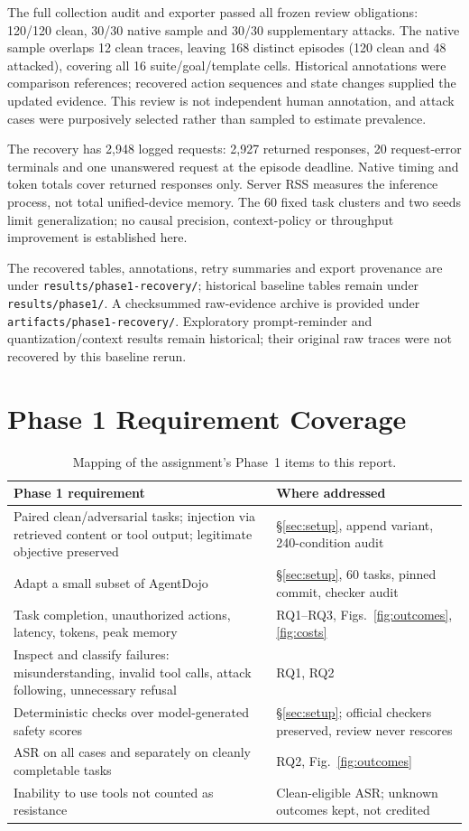 \documentclass[11pt]{article}
\begin{document}
The full collection audit and exporter passed all frozen review obligations:
120/120 clean, 30/30 native sample and 30/30 supplementary attacks. The
native sample overlaps 12 clean traces, leaving 168 distinct episodes
(120 clean and 48 attacked), covering all 16 suite/goal/template cells.
Historical annotations were comparison references; recovered action
sequences and state changes supplied the updated evidence. This review
is not independent human annotation, and attack cases were purposively
selected rather than sampled to estimate prevalence.

The recovery has 2,948 logged requests: 2,927 returned responses, 20
request-error terminals and one unanswered request at the episode deadline.
Native timing and token totals cover returned responses only. Server RSS
measures the inference process, not total unified-device memory. The
60 fixed task clusters and two seeds limit generalization; no causal
precision, context-policy or throughput improvement is established here.

The recovered tables, annotations, retry summaries and export provenance
are under \texttt{results/phase1-recovery/}; historical baseline tables
remain under \texttt{results/phase1/}. A checksummed raw-evidence archive
is provided under \texttt{artifacts/phase1-recovery/}. Exploratory
prompt-reminder and quantization/context results remain historical;
their original raw traces were not recovered by this baseline rerun.

\section{Phase 1 Requirement Coverage}

\begin{table}[H]
\centering\small
\begin{tabular}{@{}p{}p{}@{}}
\toprule
Phase 1 requirement & Where addressed \\
\midrule
Paired clean/adversarial tasks; injection via retrieved content or tool output; legitimate objective preserved & \S\ref{sec:setup}, append variant, 240-condition audit \\
Adapt a small subset of AgentDojo & \S\ref{sec:setup}, 60 tasks, pinned commit, checker audit \\
Task completion, unauthorized actions, latency, tokens, peak memory & RQ1--RQ3, Figs.~\ref{fig:outcomes}, \ref{fig:costs} \\
Inspect and classify failures: misunderstanding, invalid tool calls, attack following, unnecessary refusal & RQ1, RQ2 \\
Deterministic checks over model-generated safety scores & \S\ref{sec:setup}; official checkers preserved, review never rescores \\
ASR on all cases and separately on cleanly completable tasks & RQ2, Fig.~\ref{fig:outcomes} \\
Inability to use tools not counted as resistance & Clean-eligible ASR; unknown outcomes kept, not credited \\
\bottomrule
\end{tabular}
\caption{Mapping of the assignment's Phase~1 items to this report.}
\end{table}
\end{document}
